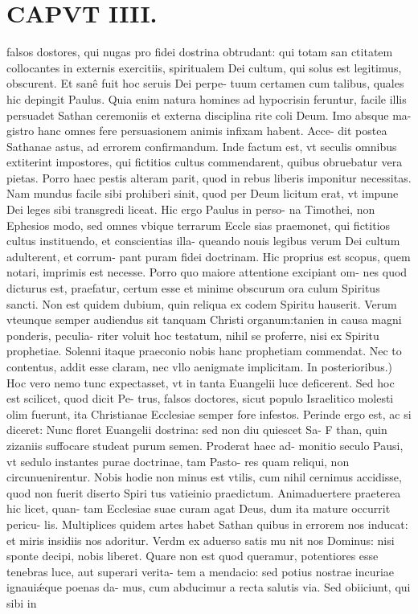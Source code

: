 \documentclass{article}
\begin{document}
\begin{pages}
\subsection*{\textit{}}
\section*{CAPVT IIII. }
\marginpar{[ p.43 ]}\pstart falsos dostores, qui nugas pro fidei dostrina obtrudant: qui totam san ctitatem collocantes in externis exercitiis, spiritualem Dei cultum, qui solus est legitimus, obscurent. Et sanê fuit hoc seruis Dei perpe- tuum certamen cum talibus, quales hic depingit Paulus. Quia enim natura homines ad hypocrisin feruntur, facile illis persuadet Sathan ceremoniis et externa disciplina rite coli Deum. Imo absque ma- gistro hanc omnes fere persuasionem animis infixam habent. Acce- dit postea Sathanae astus, ad errorem confirmandum. Inde factum est, vt seculis omnibus extiterint impostores, qui fictitios cultus commendarent, quibus obruebatur vera pietas. Porro haec pestis alteram parit, quod in rebus liberis imponitur necessitas. Nam mundus facile sibi prohiberi sinit, quod per Deum licitum erat, vt impune Dei leges sibi transgredi liceat. Hic ergo Paulus in perso- na Timothei, non Ephesios modo, sed omnes vbique terrarum Eccle sias praemonet, qui fictitios cultus instituendo, et conscientias illa- queando nouis legibus verum Dei cultum adulterent, et corrum- pant puram fidei doctrinam. Hic proprius est scopus, quem notari, imprimis est necesse. Porro quo maiore attentione excipiant om- nes quod dicturus est, praefatur, certum esse et minime obscurum ora culum Spiritus sancti. Non est quidem dubium, quin reliqua ex codem Spiritu hauserit. Verum vteunque semper audiendus sit tanquam Christi organum:tanien in causa magni ponderis, peculia- riter voluit hoc testatum, nihil se proferre, nisi ex Spiritu prophetiae. Solenni itaque praeconio nobis hanc prophetiam commendat. Nec to contentus, addit esse claram, nec vllo aenigmate implicitam.  \pend\pstart In posterioribus.) Hoc vero nemo tunc expectasset, vt in tanta Euangelii luce deficerent. Sed hoc est scilicet, quod dicit Pe- trus, falsos doctores, sicut populo Israelitico molesti olim fuerunt, ita Christianae Ecclesiae semper fore infestos. Perinde ergo est, ac si diceret: Nunc floret Euangelii dostrina: sed non diu quiescet Sa- F than, quin zizaniis suffocare studeat purum semen. Proderat haec ad- monitio seculo Pausi, vt sedulo instantes purae doctrinae, tam Pasto- res quam reliqui, non circunuenirentur. Nobis hodie non minus est vtilis, cum nihil cernimus accidisse, quod non fuerit diserto Spiri tus vatieinio praedictum. Animaduertere praeterea hic licet, quan- tam Ecclesiae suae curam agat Deus, dum ita mature occurrit pericu- lis. Multiplices quidem artes habet Sathan quibus in errorem nos inducat: et miris insidiis nos adoritur. Verdm ex aduerso satis mu nit nos Dominus: nisi sponte decipi, nobis liberet. Quare non est quod queramur, potentiores esse tenebras luce, aut superari verita- tem a mendacio: sed potius nostrae incuriae ignauiǽque poenas da- mus, cum abducimur a recta salutis via. Sed obiiciunt, qui sibi in  \pend

\end{pages}
\end{document}
